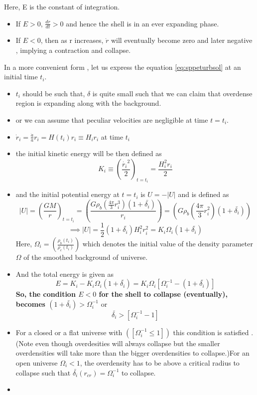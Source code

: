 \documentclass[12pt]{report}
\newcommand{\tbf}[1]{\textbf{#1}}
\newcommand{\cc}[1]{\left({#1}\right)}
\begin{document}
 Here, E is the constant of integration.
 \begin{itemize}
 \item If $E>0$, $\frac{dr}{dt}>0$ and hence the shell is in an ever expanding phase.
 \item If $ E<0$, then as r increases, $\dot{r}$ will eventually become zero and later negative , implying a contraction and collapse.
 \end{itemize}
 In a more convenient form , let us express the equation \eqref{eq:sppeturbsol} at an initial time $t_i$.
 \begin{itemize}
 \item $t_i$ should be such that, $\delta$ is quite small such that we can claim that overdense region is expanding along with the background.
 \item or we can assume that peculiar velocities  are negligible at time $t=t_i$.
 \item $\dot{r}_i=\frac{\dot{a}}{a}r_i=H(t_i)r_i\equiv H_ir_i$ at time $t_i$
 \item the initial kinetic energy will be then defined as 
 \begin{equation}
 K_i\equiv\cc{\frac{\dot{r_i}^2}{2}}_{t=t_i}=\frac{H_i^2r_i}{2} 
 \end{equation}
\item  and the initial potential energy at $t=t_i$ is $U=-|U|$ and is defined as 
\begin{equation*}
|U|=\cc{\frac{GM}{r}}_{t=t_i}=\cc{\frac{G\rho_b\cc{\frac{4\pi}{3}r_i^3}(1+\bar{\delta_i})}{r_i}}=\cc{G\rho_b\cc{\frac{4\pi}{3}r_i^2}(1+\bar{\delta_i})}
\end{equation*} 
\begin{equation}
\implies |U|=\frac{1}{2}(1+\bar{\delta_i})H_i^2r_i^2=K_i\Omega_i(1+\bar{\delta_i})
\end{equation} 
Here, $\Omega_i=\cc{\frac{\rho_b(t_i)}{\rho_c(t_i)}}$ which denotes the initial value of the density parameter $\Omega$ of the smoothed background of universe.
\item And the total energy is given as 
\begin{equation}
E=K_i-K_i\Omega_i(1+\bar{\delta_i})=K_i\Omega_i[\Omega_i^{-1}-(1+\bar{\delta_i})]
\end{equation}
 \tbf{So, the condition $E<0$ for the shell to collapse (eventually), becomes $(1+\bar{\delta_i})>\Omega_i^{-1}$} or 
 \begin{equation}
 \bar{\delta_i}>[\Omega_i^{-1}-1]
 \end{equation}
  \item For a closed or a flat universe with $\cc{[\Omega_i^{-1}\leq 1]}$ this condition is satisfied . (Note even though overdesities will always collapse but the smaller overdensities will take more than the bigger overdensities to collapse.)For an open universe $\Omega_i<1$, the overdensity has to be above a critical radius to collapse such that $\bar{\delta_i}(r_{cr})=\Omega_i^{-1}$ to collapse.
\item 
 \end{itemize}
\end{document}
